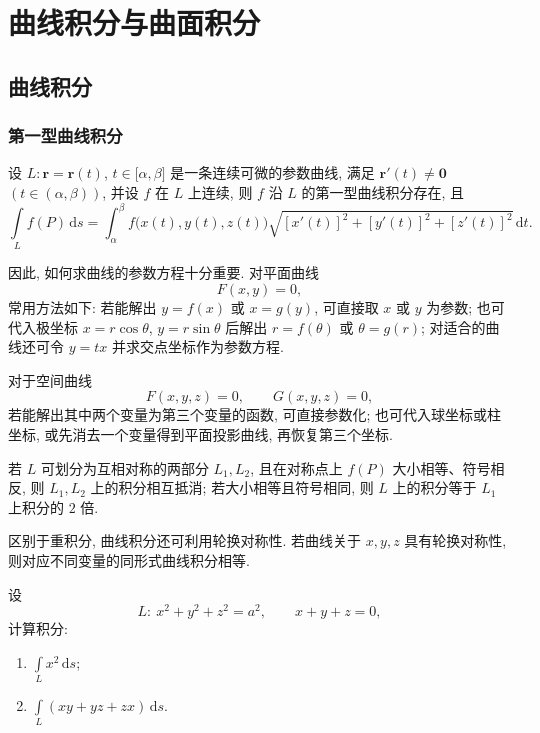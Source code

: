 \setcounter{chapter}{12}
\pagestyle{fancy}

\chapter{曲线积分与曲面积分}


\section{曲线积分}


\subsection{第一型曲线积分}

\begin{theorem}
    设 $L:\bm r=\bm r(t)$, $t\in\lbrack\alpha,\beta\rbrack$ 是一条连续可微的参数曲线, 满足 $\bm r'(t)\ne\bm0$ $(t\in(\alpha,\beta))$, 并设 $f$ 在 $L$ 上连续, 则 $f$ 沿 $L$ 的第一型曲线积分存在, 且
    \[
        \int\limits_L f(P)\,\mathrm{d}s
        =\int_\alpha^\beta f\bigl(x(t),y(t),z(t)\bigr)
        \sqrt{[x'(t)]^2+[y'(t)]^2+[z'(t)]^2}\,\mathrm{d}t.
    \]
\end{theorem}

因此, 如何求曲线的参数方程十分重要. 对平面曲线
\[
    F(x,y)=0,
\]
常用方法如下: 若能解出 $y=f(x)$ 或 $x=g(y)$, 可直接取 $x$ 或 $y$ 为参数; 也可代入极坐标 $x=r\cos\theta$, $y=r\sin\theta$ 后解出 $r=f(\theta)$ 或 $\theta=g(r)$; 对适合的曲线还可令 $y=tx$ 并求交点坐标作为参数方程.

对于空间曲线
\[
    F(x,y,z)=0,\qquad G(x,y,z)=0,
\]
若能解出其中两个变量为第三个变量的函数, 可直接参数化; 也可代入球坐标或柱坐标, 或先消去一个变量得到平面投影曲线, 再恢复第三个坐标.

\begin{theorem}
    若 $L$ 可划分为互相对称的两部分 $L_1,L_2$, 且在对称点上 $f(P)$ 大小相等、符号相反, 则 $L_1,L_2$ 上的积分相互抵消; 若大小相等且符号相同, 则 $L$ 上的积分等于 $L_1$ 上积分的 $2$ 倍.
\end{theorem}

\begin{remark}
    区别于重积分, 曲线积分还可利用轮换对称性. 若曲线关于 $x,y,z$ 具有轮换对称性, 则对应不同变量的同形式曲线积分相等.
\end{remark}

\begin{example}
    设
    \[
        L:\ x^2+y^2+z^2=a^2,\qquad x+y+z=0,
    \]
    计算积分:
    \begin{enumerate}
        \item $\displaystyle\int\limits_L x^2\,\mathrm{d}s$;
        \item $\displaystyle\int\limits_L(xy+yz+zx)\,\mathrm{d}s$.
    \end{enumerate}
\end{example}
\exampleblank

